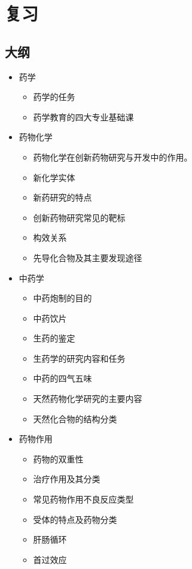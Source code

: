 \section{复习}%
\label{sec:复习}
\subsection*{大纲}%
\label{sub:大纲}
\begin{itemize}
    \item 药学
    \begin{itemize}
        \item 药学的任务
        \item 药学教育的四大专业基础课
    \end{itemize}
    \item 药物化学
    \begin{itemize}
        \item 药物化学在创新药物研究与开发中的作用。
        \item 新化学实体
        \item 新药研究的特点
        \item 创新药物研究常见的靶标
        \item 构效关系
        \item 先导化合物及其主要发现途径
    \end{itemize}
    \item 中药学
    \begin{itemize}
        \item 中药炮制的目的
        \item 中药饮片
        \item 生药的鉴定
        \item 生药学的研究内容和任务
        \item 中药的四气五味
        \item 天然药物化学研究的主要内容
        \item 天然化合物的结构分类
    \end{itemize}
    \item 药物作用
    \begin{itemize}
        \item 药物的双重性
        \item 治疗作用及其分类
        \item 常见药物作用不良反应类型
        \item 受体的特点及药物分类
        \item 肝肠循环
        \item 首过效应

\end{itemize}
\end{itemize}

